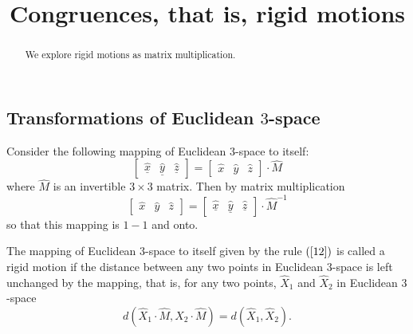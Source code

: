 \documentclass{ximera}
\title{Congruences, that is, rigid motions}
\begin{document}
\begin{abstract}
We explore rigid motions as matrix multiplication.
\end{abstract}
\maketitle

\subsection*{Transformations of Euclidean $3$-space}

Consider the following mapping of Euclidean $3$-space to itself:%
\begin{equation}
\begin{bmatrix}
%
\underline{\hat{x}} & \underline{\hat{y}} & \underline{\hat{z}}%
\end{bmatrix}
  =\begin{bmatrix}
%
\hat{x} & \hat{y} & \hat{z}%
\end{bmatrix}
  \cdot\hat{M} \label{12}%
\end{equation}
where $\hat{M}$ is an invertible $3\times3$ matrix. Then by matrix
multiplication%
\[
\begin{bmatrix}
%
\hat{x} & \hat{y} & \hat{z}%
\end{bmatrix}
  =\begin{bmatrix}
%
\underline{\hat{x}} & \underline{\hat{y}} & \underline{\hat{z}}%
\end{bmatrix}
  \cdot\hat{M}^{-1}%
\]
so that this mapping is $1-1$ and onto.

\begin{definition}
The mapping of Euclidean $3$-space to itself given by the rule $\left(
\ref{12}\right)  $ is called a rigid motion if the distance between any two
points in Euclidean $3$-space is left unchanged by the mapping, that is, for
any two points, $\hat{X}_{1}$ and $\hat{X}_{2}$ in Euclidean $3$-space%
\[
d\left( \hat{X}_{1}  \cdot\hat{M},\hat{X}_{2}
\cdot\hat{M}\right)  =d\left(  \hat{X}_{1},\hat{X}_{2}\right)  .
\]

\end{definition}
\end{document}
